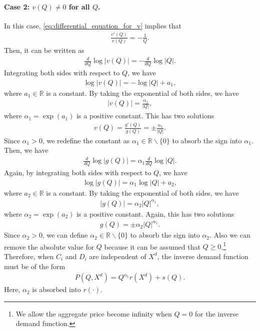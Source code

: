 \documentclass[11pt, a4paper]{article}
\theoremstyle{remark}
\begin{document}
\paragraph{Case 2: $v(Q) \ne 0$ for all $Q$.}
In this case, \eqref{eq:differential_equation_for_v} implies that
\begin{align}
    \frac{v'(Q)}{v(Q)} = -\frac{1}{Q}.
\end{align}
Then, it can be written as
\begin{align}
    \frac{d }{d Q}\log |v(Q)| = -\frac{d}{dQ}\log |Q|.
\end{align}
Integrating both sides with respect to $Q$, we have
\begin{align}
    \log |v(Q)| = -\log |Q| + a_1,
\end{align}
where $a_1 \in \mathbb{R}$ is a constant.
By taking the exponential of both sides, we have
\begin{align}
    |v(Q)| = \frac{\alpha_1}{|Q|}, 
\end{align}
where $\alpha_1 = \exp(a_1)$ is a positive constant.
This has two solutions
\begin{align}
    v(Q) = \frac{g'(Q)}{g(Q)} = \pm \frac{\alpha_1}{|Q|}.
\end{align}
Since $\alpha_1 > 0$, we redefine the constant as $\alpha_1 \in \mathbb{R} \backslash \{0\}$ to absorb the sign into $\alpha_1$.
Then, we have 
\begin{align}
    \frac{d }{d Q}\log |g(Q)| = \alpha_1\frac{d}{dQ}\log |Q|.
\end{align}
Again, by integrating both sides with respect to $Q$, we have
\begin{align}
    \log |g(Q)| = \alpha_1\log |Q| + a_2,
\end{align}
where $a_2 \in \mathbb{R}$ is a constant.
By taking the exponential of both sides, we have
\begin{align}
    |g(Q)| = \alpha_2 |Q|^{\alpha_1},
\end{align}
where $\alpha_2 = \exp(a_2)$ is a positive constant.
Again, this has two solutions
\begin{align}
    g(Q) = \pm \alpha_2|Q|^{\alpha_1}.
\end{align}
Since $\alpha_2 > 0$, we can define $\alpha_2 \in \mathbb{R} \backslash \{0\}$ to absorb the sign into $\alpha_2$.
Also we can remove the absolute value for $Q$ because it can be assumed that $Q\ge 0$.\footnote{We allow the aggregate price become infinity when $Q = 0$ for the inverse demand function.}
Therefore, when $C_i$ and $D_i$ are independent of $X^{d}$, the inverse demand function must be of the form
\begin{align}
    P(Q, X^{d}) = Q^{\alpha_1}r(X^{d}) + s(Q). \label{eq:inverse_demand_separable_step2}
\end{align}
Here, $\alpha_2$ is absorbed into $r(\cdot)$.
\end{document}

